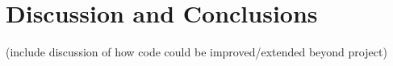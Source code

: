 \section{Discussion and Conclusions} %
\label{sec:discussion}
(include discussion of how code could be improved/extended beyond project)
